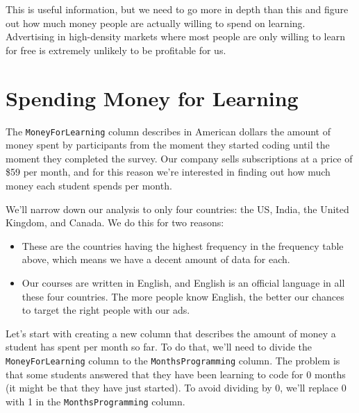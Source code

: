 \documentclass[
]{article}
\providecommand{\tightlist}{%
  \setlength{\itemsep}{0pt}\setlength{\parskip}{0pt}}
\begin{document}
This is useful information, but we need to go more in depth than this
and figure out how much money people are actually willing to spend on
learning. Advertising in high-density markets where most people are only
willing to learn for free is extremely unlikely to be profitable for us.

\hypertarget{spending-money-for-learning}{%
\section{Spending Money for
Learning}\label{spending-money-for-learning}}

The \texttt{MoneyForLearning} column describes in American dollars the
amount of money spent by participants from the moment they started
coding until the moment they completed the survey. Our company sells
subscriptions at a price of \$59 per month, and for this reason we're
interested in finding out how much money each student spends per month.

We'll narrow down our analysis to only four countries: the US, India,
the United Kingdom, and Canada. We do this for two reasons:

\begin{itemize}
\tightlist
\item
  These are the countries having the highest frequency in the frequency
  table above, which means we have a decent amount of data for each.
\item
  Our courses are written in English, and English is an official
  language in all these four countries. The more people know English,
  the better our chances to target the right people with our ads.
\end{itemize}

Let's start with creating a new column that describes the amount of
money a student has spent per month so far. To do that, we'll need to
divide the \texttt{MoneyForLearning} column to the
\texttt{MonthsProgramming} column. The problem is that some students
answered that they have been learning to code for 0 months (it might be
that they have just started). To avoid dividing by 0, we'll replace 0
with 1 in the \texttt{MonthsProgramming} column.
\end{document}
